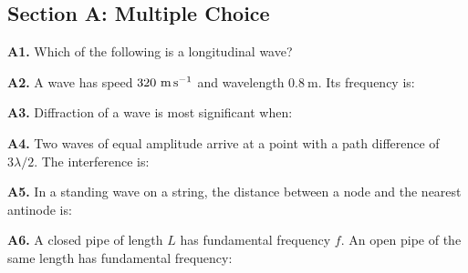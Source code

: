 \newpage
\begin{exercisebox}[17]

\subsection*{Section A: Multiple Choice}

\textbf{A1.} Which of the following is a
longitudinal wave?


\vspace{0.4cm}

\textbf{A2.} A wave has speed $320\ \text{m\,s}^{-1}$
and wavelength $0.8\ \text{m}$. Its frequency is:


\vspace{0.4cm}

\textbf{A3.} Diffraction of a wave is most
significant when:


\vspace{0.4cm}

\textbf{A4.} Two waves of equal amplitude arrive
at a point with a path difference of $3\lambda/2$.
The interference is:


\vspace{0.4cm}

\textbf{A5.} In a standing wave on a string, the
distance between a node and the nearest antinode is:


\vspace{0.4cm}

\textbf{A6.} A closed pipe of length $L$ has
fundamental frequency $f$. An open pipe of the
same length has fundamental frequency:


\end{exercisebox}
